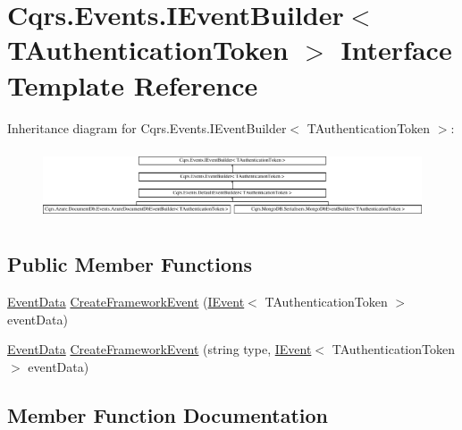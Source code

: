 \hypertarget{interfaceCqrs_1_1Events_1_1IEventBuilder}{}\section{Cqrs.\+Events.\+I\+Event\+Builder$<$ T\+Authentication\+Token $>$ Interface Template Reference}
\label{interfaceCqrs_1_1Events_1_1IEventBuilder}
Inheritance diagram for Cqrs.\+Events.\+I\+Event\+Builder$<$ T\+Authentication\+Token $>$\+:\begin{figure}[H]
\begin{center}
\leavevmode
\includegraphics[height=2.117202cm]{interfaceCqrs_1_1Events_1_1IEventBuilder}
\end{center}
\end{figure}
\subsection*{Public Member Functions}
\begin{DoxyCompactItemize}
\item 
\hyperlink{classCqrs_1_1Events_1_1EventData}{Event\+Data} \hyperlink{interfaceCqrs_1_1Events_1_1IEventBuilder_a3c0cb2db87e496ad64f481a6cce2c79d}{Create\+Framework\+Event} (\hyperlink{interfaceCqrs_1_1Events_1_1IEvent}{I\+Event}$<$ T\+Authentication\+Token $>$ event\+Data)
\item 
\hyperlink{classCqrs_1_1Events_1_1EventData}{Event\+Data} \hyperlink{interfaceCqrs_1_1Events_1_1IEventBuilder_ac77123302de4e79df9661c13219af4d4}{Create\+Framework\+Event} (string type, \hyperlink{interfaceCqrs_1_1Events_1_1IEvent}{I\+Event}$<$ T\+Authentication\+Token $>$ event\+Data)
\end{DoxyCompactItemize}


\subsection{Member Function Documentation}
\mbox{\label{interfaceCqrs_1_1Events_1_1IEventBuilder_a3c0cb2db87e496ad64f481a6cce2c79d}} 
